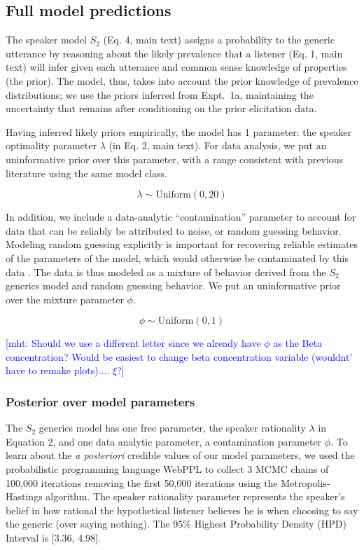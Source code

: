 \documentclass[10pt,letterpaper]{article}
\newcommand{\mht}[1]{\textcolor{Blue}{[mht: #1]}}
\begin{document}
\subsection{Full model predictions}
\label{sec:posteriorbda1}
The speaker model $S_2$ (Eq. 4, main text) assigns a probability to the generic utterance by reasoning about the likely prevalence that a listener (Eq. 1, main text) will infer given each utterance and common sense knowledge of properties (the prior). 
The model, thus, takes into account the prior knowledge of prevalence distributions; we use the priors inferred from Expt.~1a, maintaining the uncertainty that remains after conditioning on the prior elicitation data. 


Having inferred likely priors empirically, the model has 1 parameter: the speaker optimality parameter $\lambda$ (in Eq. 2, main text). 
For data analysis, we put an uninformative prior over this parameter, with a range consistent with previous literature using the same model class.

$$
\lambda \sim \text{Uniform}(0,20)
$$

In addition, we include a data-analytic ``contamination'' parameter to account for data that can be reliably be attributed to noise, or random guessing behavior.
Modeling random guessing explicitly is important for recovering reliable estimates of the parameters of the model, which would otherwise be contaminated by this data \cite{LW2014}.
The data is thus modeled as a mixture of behavior derived from the $S_2$ generics model and random guessing behavior. 
We put an uninformative prior over the mixture parameter $\phi$.

$$
\phi \sim \text{Uniform}(0,1)
$$

\mht{Should we use a different letter since we already have $\phi$ as the Beta concentration? Would be easiest to change beta concentration variable (wouldnt' have to remake plots).... $\xi$?}


\subsubsection{Posterior over model parameters}

The $S_2$ generics model has one free parameter, the speaker rationality $\lambda$ in Equation 2, and one data analytic parameter, a contamination parameter $\phi$.
To learn about the \emph{a posteriori} credible values of our model parameters, we used the probabilistic programming language WebPPL \cite{dippl} to collect 3 MCMC chains of 100,000 iterations removing the first 50,000 iterations using the Metropolis-Hastings algorithm. 
The speaker rationality parameter represents the speaker's belief in how rational the hypothetical listener believes he is when choosing to say the generic (over saying nothing). 
The 95\% Highest Probability Density (HPD) Interval is [3.36, 4.98].
\end{document}
